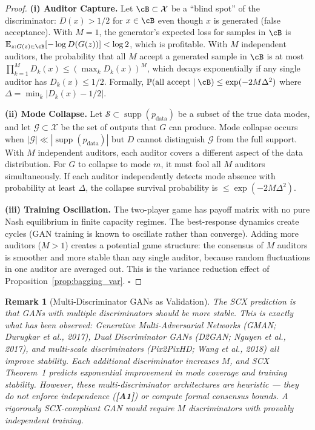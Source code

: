 \documentclass[12pt,a4paper]{article}
\newtheorem{remark}[theorem]{Remark}
\theoremstyle{definition}
\newcommand{\SCX}{\textsc{SCX}}
\DeclareMathOperator{\supp}{supp}
\newcommand{\E}{\mathbb{E}}
\newcommand{\Pbb}{\mathbb{P}}
\newcommand{\cG}{\mathcal{G}}
\newcommand{\cS}{\mathcal{S}}
\newcommand{\cX}{\mathcal{X}}
\newcommand{\asmTag}[1]{\textsf{\textbf{[A#1]}}}
\begin{document}
\begin{proof}
\textbf{(i) Auditor Capture.} Let $\cB \subset \cX$ be a ``blind spot'' of the discriminator: $D(x) > 1/2$ for $x \in \cB$ even though $x$ is generated (false acceptance). With $M=1$, the generator's expected loss for samples in $\cB$ is $\E_{z: G(z) \in \cB}[-\log D(G(z))] < \log 2$, which is profitable. With $M$ independent auditors, the probability that all $M$ accept a generated sample in $\cB$ is at most $\prod_{k=1}^M D_k(x) \le (\max_k D_k(x))^M$, which decays exponentially if any single auditor has $D_k(x) \le 1/2$. Formally, $\Pbb(\text{all accept} \mid \cB) \le \exp(-2M\Delta^2)$ where $\Delta = \min_k |D_k(x) - 1/2|$.

\textbf{(ii) Mode Collapse.} Let $\cS \subset \supp(p_{\text{data}})$ be a subset of the true data modes, and let $\cG \subset \cX$ be the set of outputs that $G$ can produce. Mode collapse occurs when $|\cG| \ll |\supp(p_{\text{data}})|$ but $D$ cannot distinguish $\cG$ from the full support. With $M$ independent auditors, each auditor covers a different aspect of the data distribution. For $G$ to collapse to mode $m$, it must fool all $M$ auditors simultaneously. If each auditor independently detects mode absence with probability at least $\Delta$, the collapse survival probability is $\le \exp(-2M\Delta^2)$.

\textbf{(iii) Training Oscillation.} The two-player game has payoff matrix with no pure Nash equilibrium in finite capacity regimes. The best-response dynamics create cycles (GAN training is known to oscillate rather than converge). Adding more auditors ($M>1$) creates a potential game structure: the consensus of $M$ auditors is smoother and more stable than any single auditor, because random fluctuations in one auditor are averaged out. This is the variance reduction effect of Proposition~\ref{prop:bagging_var}. \hfill $\square$
\end{proof}

\begin{remark}[Multi-Discriminator GANs as Validation]
The \SCX{} prediction is that GANs with multiple discriminators should be more stable. This is exactly what has been observed: Generative Multi-Adversarial Networks (GMAN; Durugkar et al., 2017), Dual Discriminator GANs (D2GAN; Nguyen et al., 2017), and multi-scale discriminators (Pix2PixHD; Wang et al., 2018) all improve stability. Each additional discriminator increases $M$, and \SCX{} Theorem~1 predicts exponential improvement in mode coverage and training stability. However, these multi-discriminator architectures are heuristic — they do not enforce independence (\asmTag{1}) or compute formal consensus bounds. A rigorously \SCX{}-compliant GAN would require $M$ discriminators with provably independent training.
\end{remark}
\end{document}

